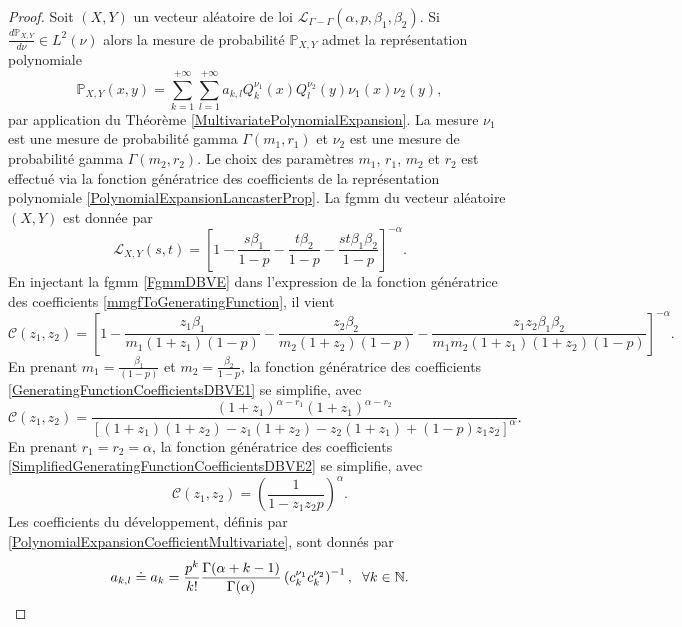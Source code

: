 \begin{proof}
Soit $(X,Y)$ un vecteur aléatoire de loi $\mathcal{L}_{\Gamma-\Gamma}(\alpha,p,\beta_{1},\beta_{2})$. Si $\frac{d\mathbb{P}_{X,Y}}{d\nu}\in L^{2}(\nu)$ alors la mesure de probabilité $\mathbb{P}_{X,Y}$ admet la représentation polynomiale
\begin{equation}\label{PolynomialExpansionLancasterProp}
\mathbb{P}_{X,Y}(x,y)=\sum_{k=1}^{+\infty}\sum_{l=1}^{+\infty}a_{k,l}Q_{k}^{\nu_{1}}(x)Q_{l}^{\nu_{2}}(y)\nu_{1}(x)\nu_{2}(y),
\end{equation}
par application du Théorème \ref{MultivariatePolynomialExpansion}. La mesure $\nu_{1}$ est une mesure de probabilité gamma $\Gamma(m_{1},r_{1})$ et $\nu_{2}$ est une mesure de probabilité gamma $\Gamma\left(m_{2},r_{2}\right)$. Le choix des paramètres $m_{1}$, $r_{1}$, $m_{2}$ et $r_{2}$ est effectué via la fonction génératrice des coefficients de la représentation polynomiale \eqref{PolynomialExpansionLancasterProp}. La \gls{fgmm} du vecteur aléatoire $(X,Y)$ est donnée par 
\begin{equation}\label{FgmmDBVE}
\mathcal{L}_{X,Y}(s,t)=\left[1-\frac{s\beta_{1}}{1-p}-\frac{t\beta_{2}}{1-p}-\frac{st\beta_{1}\beta_{2}}{1-p}\right]^{-\alpha}.
\end{equation}
En injectant la \gls{fgmm} \eqref{FgmmDBVE} dans l'expression de la fonction génératrice des coefficients \eqref{mmgfToGeneratingFunction}, il vient 
\begin{equation}\label{GeneratingFunctionCoefficientsDBVE1}
\mathcal{C}(z_{1},z_{2})=\left[1-\frac{z_{1}\beta_{1}}{m_{1}(1+z_{1})(1-p)}-\frac{z_{2}\beta_{2}}{m_{2}(1+z_{2})(1-p)}-\frac{z_{1}z_{2}\beta_{1}\beta_{2}}{m_{1}m_{2}(1+z_{1})(1+z_{2})(1-p)}\right]^{-\alpha}.
\end{equation}
En prenant $m_{1}=\frac{\beta_{1}}{(1-p)}$ et $m_{2}=\frac{\beta_{2}}{1-p}$, la fonction génératrice des coefficients \eqref{GeneratingFunctionCoefficientsDBVE1} se simplifie, avec 
\begin{equation}\label{SimplifiedGeneratingFunctionCoefficientsDBVE2}
\mathcal{C}(z_{1},z_{2})=\frac{(1+z_{1})^{\alpha-r_{1}}(1+z_{1})^{\alpha-r_{2}}}{\left[(1+z_{1})(1+z_{2})-z_{1}(1+z_{2})-z_{2}(1+z_{1})+(1-p)z_{1}z_{2}\right]^{\alpha}}.
\end{equation}
En prenant $r_{1}=r_{2}=\alpha$, la fonction génératrice des coefficients \eqref{SimplifiedGeneratingFunctionCoefficientsDBVE2} se simplifie, avec 
\begin{equation}\label{SimplifiedGeneratingFunctionCoefficientsDBVE3}
\mathcal{C}(z_{1},z_{2})=\left(\frac{1}{1-z_{1}z_{2}p}\right)^{\alpha}.
\end{equation}
Les coefficients du développement, définis par \eqref{PolynomialExpansionCoefficientMultivariate}, sont donnés par 
\begin{equation}
a_{k,l}\doteq a_{k}=\frac{p^{k}}{k!}\frac{\Gamma(\alpha+k-1)}{\Gamma(\alpha)}\left(c^{\nu_{1}}_{k}c^{\nu_{2}}_{k}\right)^{-1},\hspace{0.2cm}\forall k\in\mathbb{N}.
\end{equation}
\end{proof}
